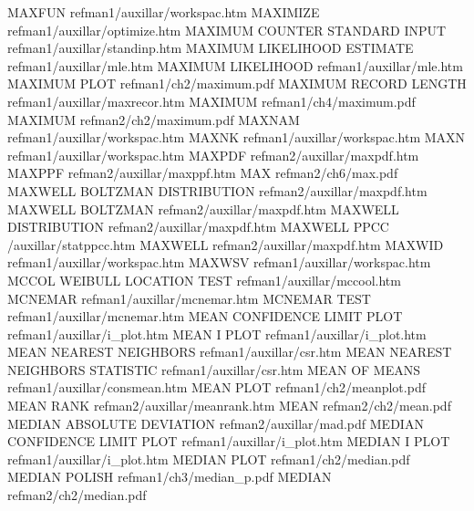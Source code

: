 MAXFUN                                  refman1/auxillar/workspac.htm
MAXIMIZE                                refman1/auxillar/optimize.htm
MAXIMUM COUNTER STANDARD INPUT          refman1/auxillar/standinp.htm
MAXIMUM LIKELIHOOD ESTIMATE             refman1/auxillar/mle.htm
MAXIMUM LIKELIHOOD                      refman1/auxillar/mle.htm
MAXIMUM PLOT                            refman1/ch2/maximum.pdf
MAXIMUM RECORD LENGTH                   refman1/auxillar/maxrecor.htm
MAXIMUM                                 refman1/ch4/maximum.pdf
MAXIMUM                                 refman2/ch2/maximum.pdf
MAXNAM                                  refman1/auxillar/workspac.htm
MAXNK                                   refman1/auxillar/workspac.htm
MAXN                                    refman1/auxillar/workspac.htm
MAXPDF                                  refman2/auxillar/maxpdf.htm
MAXPPF                                  refman2/auxillar/maxppf.htm
MAX                                     refman2/ch6/max.pdf
MAXWELL BOLTZMAN DISTRIBUTION           refman2/auxillar/maxpdf.htm
MAXWELL BOLTZMAN                        refman2/auxillar/maxpdf.htm
MAXWELL DISTRIBUTION                    refman2/auxillar/maxpdf.htm
MAXWELL PPCC                            /auxillar/statppcc.htm
MAXWELL                                 refman2/auxillar/maxpdf.htm
MAXWID                                  refman1/auxillar/workspac.htm
MAXWSV                                  refman1/auxillar/workspac.htm
MCCOL WEIBULL LOCATION TEST             refman1/auxillar/mccool.htm
MCNEMAR                                 refman1/auxillar/mcnemar.htm
MCNEMAR TEST                            refman1/auxillar/mcnemar.htm
MEAN CONFIDENCE LIMIT PLOT              refman1/auxillar/i_plot.htm
MEAN I PLOT                             refman1/auxillar/i_plot.htm
MEAN NEAREST NEIGHBORS                  refman1/auxillar/csr.htm
MEAN NEAREST NEIGHBORS STATISTIC        refman1/auxillar/csr.htm
MEAN OF MEANS                           refman1/auxillar/consmean.htm
MEAN PLOT                               refman1/ch2/meanplot.pdf
MEAN RANK                               refman2/auxillar/meanrank.htm
MEAN                                    refman2/ch2/mean.pdf
MEDIAN ABSOLUTE DEVIATION               refman2/auxillar/mad.pdf
MEDIAN CONFIDENCE LIMIT PLOT            refman1/auxillar/i_plot.htm
MEDIAN I PLOT                           refman1/auxillar/i_plot.htm
MEDIAN PLOT                             refman1/ch2/median.pdf
MEDIAN POLISH                           refman1/ch3/median_p.pdf
MEDIAN                                  refman2/ch2/median.pdf
